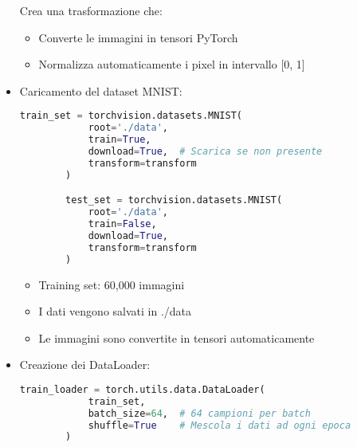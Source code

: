 \documentclass[a4paper,12pt]{article}
\begin{document}
\begin{itemize}
\begin{lstlisting}[language=Python, basicstyle=\ttfamily\footnotesize, breaklines=true, frame=single]
    \end{lstlisting}
    Crea una trasformazione che:
    \begin{itemize}
        \item Converte le immagini in tensori PyTorch
        \item Normalizza automaticamente i pixel in intervallo [0, 1]
    \end{itemize}
    \item Caricamento del dataset MNIST:
    \begin{lstlisting}[language=Python, basicstyle=\ttfamily\footnotesize, breaklines=true, frame=single]
        train_set = torchvision.datasets.MNIST(
            root='./data', 
            train=True, 
            download=True,  # Scarica se non presente
            transform=transform
        )

        test_set = torchvision.datasets.MNIST(
            root='./data', 
            train=False, 
            download=True,
            transform=transform
        )
    \end{lstlisting}
    \begin{itemize}
        \item Training set: 60,000 immagini
        \item I dati vengono salvati in ./data
        \item Le immagini sono convertite in tensori automaticamente
    \end{itemize}
    \item Creazione dei DataLoader:
    \begin{lstlisting}[language=Python, basicstyle=\ttfamily\footnotesize, breaklines=true, frame=single]
        train_loader = torch.utils.data.DataLoader(
            train_set, 
            batch_size=64,  # 64 campioni per batch
            shuffle=True    # Mescola i dati ad ogni epoca
        )


\end{lstlisting}
\end{itemize}
\end{document}
